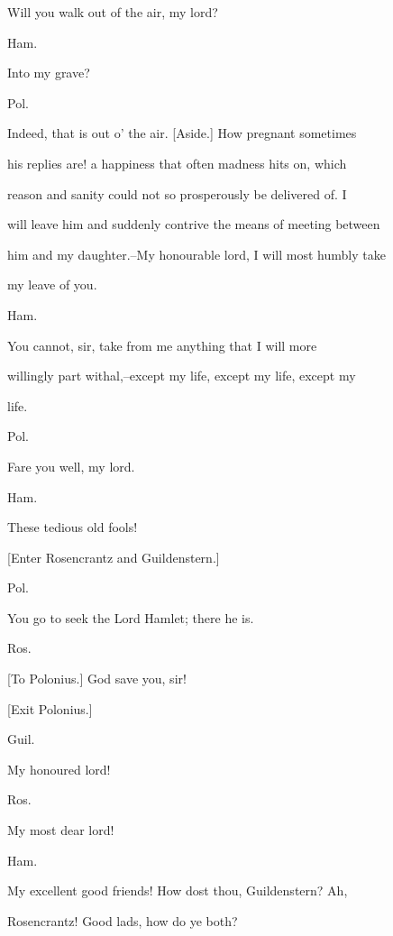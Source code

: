 \documentclass[12pt]{book}
\begin{document}
Will you walk out of the air, my lord?



Ham.

Into my grave?



Pol.

Indeed, that is out o' the air. [Aside.] How pregnant sometimes

his replies are! a happiness that often madness hits on, which

reason and sanity could not so prosperously be delivered of. I

will leave him and suddenly contrive the means of meeting between

him and my daughter.--My honourable lord, I will most humbly take

my leave of you.



Ham.

You cannot, sir, take from me anything that I will more

willingly part withal,--except my life, except my life, except my

life.



Pol.

Fare you well, my lord.



Ham.

These tedious old fools!



[Enter Rosencrantz and Guildenstern.]



Pol.

You go to seek the Lord Hamlet; there he is.



Ros.

[To Polonius.] God save you, sir!



[Exit Polonius.]



Guil.

My honoured lord!



Ros.

My most dear lord!



Ham.

My excellent good friends! How dost thou, Guildenstern? Ah,

Rosencrantz! Good lads, how do ye both?
\end{document}
